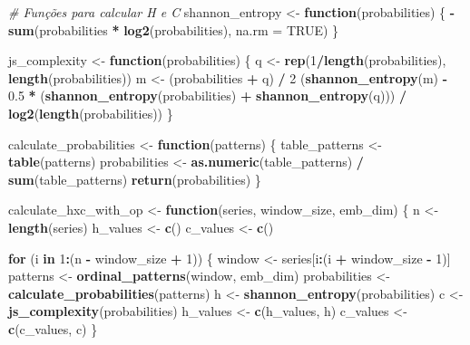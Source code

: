 \documentclass[
]{article}
\newenvironment{Shaded}{\begin{snugshade}}{\end{snugshade}}
\newcommand{\AttributeTok}[1]{\textcolor[rgb]{0.13,0.29,0.53}{#1}}
\newcommand{\CommentTok}[1]{\textcolor[rgb]{0.56,0.35,0.01}{\textit{#1}}}
\newcommand{\ConstantTok}[1]{\textcolor[rgb]{0.56,0.35,0.01}{#1}}
\newcommand{\ControlFlowTok}[1]{\textcolor[rgb]{0.13,0.29,0.53}{\textbf{#1}}}
\newcommand{\DecValTok}[1]{\textcolor[rgb]{0.00,0.00,0.81}{#1}}
\newcommand{\FloatTok}[1]{\textcolor[rgb]{0.00,0.00,0.81}{#1}}
\newcommand{\FunctionTok}[1]{\textcolor[rgb]{0.13,0.29,0.53}{\textbf{#1}}}
\newcommand{\NormalTok}[1]{#1}
\newcommand{\OtherTok}[1]{\textcolor[rgb]{0.56,0.35,0.01}{#1}}
\newcommand{\SpecialCharTok}[1]{\textcolor[rgb]{0.81,0.36,0.00}{\textbf{#1}}}
\begin{document}
\begin{Shaded}
\begin{Highlighting}[]
\CommentTok{\# Funções para calcular H e C}
\NormalTok{shannon\_entropy }\OtherTok{\textless{}{-}} \ControlFlowTok{function}\NormalTok{(probabilities) \{}
  \SpecialCharTok{{-}}\FunctionTok{sum}\NormalTok{(probabilities }\SpecialCharTok{*} \FunctionTok{log2}\NormalTok{(probabilities), }\AttributeTok{na.rm =} \ConstantTok{TRUE}\NormalTok{)}
\NormalTok{\}}

\NormalTok{js\_complexity }\OtherTok{\textless{}{-}} \ControlFlowTok{function}\NormalTok{(probabilities) \{}
\NormalTok{  q }\OtherTok{\textless{}{-}} \FunctionTok{rep}\NormalTok{(}\DecValTok{1}\SpecialCharTok{/}\FunctionTok{length}\NormalTok{(probabilities), }\FunctionTok{length}\NormalTok{(probabilities))}
\NormalTok{  m }\OtherTok{\textless{}{-}}\NormalTok{ (probabilities }\SpecialCharTok{+}\NormalTok{ q) }\SpecialCharTok{/} \DecValTok{2}
\NormalTok{  (}\FunctionTok{shannon\_entropy}\NormalTok{(m) }\SpecialCharTok{{-}} \FloatTok{0.5} \SpecialCharTok{*}\NormalTok{ (}\FunctionTok{shannon\_entropy}\NormalTok{(probabilities) }\SpecialCharTok{+} \FunctionTok{shannon\_entropy}\NormalTok{(q))) }\SpecialCharTok{/} \FunctionTok{log2}\NormalTok{(}\FunctionTok{length}\NormalTok{(probabilities))}
\NormalTok{\}}

\NormalTok{calculate\_probabilities }\OtherTok{\textless{}{-}} \ControlFlowTok{function}\NormalTok{(patterns) \{}
\NormalTok{  table\_patterns }\OtherTok{\textless{}{-}} \FunctionTok{table}\NormalTok{(patterns)}
\NormalTok{  probabilities }\OtherTok{\textless{}{-}} \FunctionTok{as.numeric}\NormalTok{(table\_patterns) }\SpecialCharTok{/} \FunctionTok{sum}\NormalTok{(table\_patterns)}
  \FunctionTok{return}\NormalTok{(probabilities)}
\NormalTok{\}}

\NormalTok{calculate\_hxc\_with\_op }\OtherTok{\textless{}{-}} \ControlFlowTok{function}\NormalTok{(series, window\_size, emb\_dim) \{}
\NormalTok{  n }\OtherTok{\textless{}{-}} \FunctionTok{length}\NormalTok{(series)}
\NormalTok{  h\_values }\OtherTok{\textless{}{-}} \FunctionTok{c}\NormalTok{()}
\NormalTok{  c\_values }\OtherTok{\textless{}{-}} \FunctionTok{c}\NormalTok{()}
  
  \ControlFlowTok{for}\NormalTok{ (i }\ControlFlowTok{in} \DecValTok{1}\SpecialCharTok{:}\NormalTok{(n }\SpecialCharTok{{-}}\NormalTok{ window\_size }\SpecialCharTok{+} \DecValTok{1}\NormalTok{)) \{}
\NormalTok{    window }\OtherTok{\textless{}{-}}\NormalTok{ series[i}\SpecialCharTok{:}\NormalTok{(i }\SpecialCharTok{+}\NormalTok{ window\_size }\SpecialCharTok{{-}} \DecValTok{1}\NormalTok{)]}
\NormalTok{    patterns }\OtherTok{\textless{}{-}} \FunctionTok{ordinal\_patterns}\NormalTok{(window, emb\_dim)}
\NormalTok{    probabilities }\OtherTok{\textless{}{-}} \FunctionTok{calculate\_probabilities}\NormalTok{(patterns)}
\NormalTok{    h }\OtherTok{\textless{}{-}} \FunctionTok{shannon\_entropy}\NormalTok{(probabilities)}
\NormalTok{    c }\OtherTok{\textless{}{-}} \FunctionTok{js\_complexity}\NormalTok{(probabilities)}
\NormalTok{    h\_values }\OtherTok{\textless{}{-}} \FunctionTok{c}\NormalTok{(h\_values, h)}
\NormalTok{    c\_values }\OtherTok{\textless{}{-}} \FunctionTok{c}\NormalTok{(c\_values, c)}
\NormalTok{  \}}
  

\end{Highlighting}
\end{Shaded}
\end{document}
